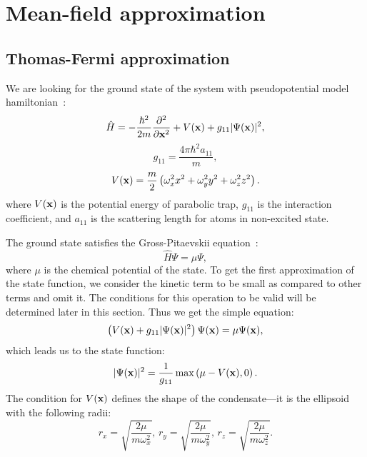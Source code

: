 \section{Mean-field approximation}


\subsection{Thomas-Fermi approximation}

We are looking for the ground state of the system with pseudopotential model hamiltonian~\cite{Pitaevskii2003}:
\[
	\hat{H} =
		- \frac{\hbar^2}{2m} \frac{\partial^2}{\partial \mathbf{x}^2}
		+ V(\mathbf{x})
		+ g_{11} \lvert \Psi(\mathbf{x}) \rvert^2,
\]
\[
	g_{11} = \frac{4 \pi \hbar^2 a_{11}}{m},
\]
\begin{equation}
\label{eqn:mean-field:trap-potential}
	V(\mathbf{x}) = \frac{m}{2} \left(
		\omega_x^2 x^2 + \omega_y^2 y^2 + \omega_z^2 z^2
	\right).
\end{equation}
where $V(\mathbf{x})$ is the potential energy of parabolic trap, $g_{11}$ is the interaction coefficient,
and $a_{11}$ is the scattering length for atoms in non-excited state.

The ground state satisfies the Gross-Pitaevskii equation~\cite{Pitaevskii2003}:
\begin{equation}
\label{eqn:mean-field:gs-shroedinger}
	\hat{H} \Psi = \mu \Psi,
\end{equation}
where $\mu$ is the chemical potential of the state.
To get the first approximation of the state function,
we consider the kinetic term to be small as compared to other terms and omit it.
The conditions for this operation to be valid will be determined later in this section.
Thus we get the simple equation:
\[
	\left( V(\mathbf{x}) + g_{11} \lvert \Psi(\mathbf{x}) \rvert^2 \right) \Psi(\mathbf{x}) = \mu \Psi(\mathbf{x}),
\]
which leads us to the state function:
\begin{equation}
\label{eqn:mean-field:tf-gs}
	\lvert \Psi(\mathbf{x}) \rvert^2 = \frac{1}{g_{11}} \max \left( \mu - V(\mathbf{x}), 0 \right).
\end{equation}
The condition for $V(\mathbf{x})$ defines the shape of the condensate---it is the ellipsoid with the following radii:
\begin{equation}
\label{eqn:mean-field:tf-radii}
	r_x = \sqrt{\frac{2\mu}{m \omega_x^2}},\,
	r_y = \sqrt{\frac{2\mu}{m \omega_y^2}},\,
	r_z = \sqrt{\frac{2\mu}{m \omega_z^2}}.
\end{equation}

